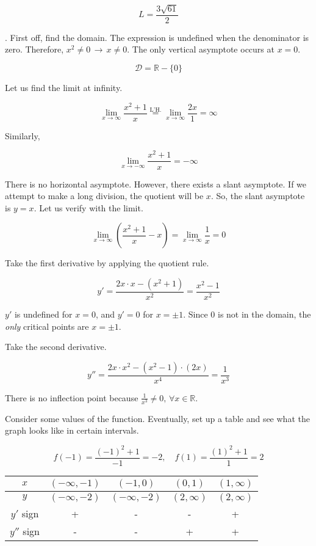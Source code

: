 \documentclass{article}
\begin{document}
\[\boxed{L=\frac{3\sqrt{61}}{2}}\]

\hfill

. First off, find the domain. The expression is undefined when the denominator is zero. Therefore, $x^2 \neq 0 \,\rightarrow\, x\neq0$. The only vertical asymptote occurs at $x = 0$.

\[\mathcal{D} = \mathbb{R} - \{0\} \]

\noindent Let us find the limit at infinity.

\[\lim_{x\to \infty} \frac{x^2+1}{x} \overset{\text{L'H.}}{=} \lim_{x\to \infty} \frac{2x}{1} = \infty\]

\noindent Similarly,

\[\lim_{x\to -\infty} \frac{x^2+ 1}{x} = -\infty\]

\hfill

\noindent There is no horizontal asymptote. However, there exists a slant asymptote. If we attempt to make a long division, the quotient will be $x$. So, the slant asymptote is $y=x$. Let us verify with the limit.

\[\lim_{x\to\infty} \left(\frac{x^2+1}{x} - x\right) = \lim_{x\to\infty} \frac{1}{x} = 0\]

\hfill

\noindent Take the first derivative by applying the quotient rule.

\[y' = \frac{2x\cdot x - (x^2+1)}{x^2}=\frac{x^2-1}{x^2}\]

\hfill

\noindent $y'$ is undefined for $x=0$, and $y'=0$ for $x=\pm1$. Since 0 is not in the domain, the \textit{only} critical points are $x=\pm 1$.

\hfill

\noindent Take the second derivative.

\[y'' = \frac{2x\cdot x^2 - (x^2-1)\cdot(2x)}{x^4}=\frac{1}{x^3}\]

\hfill

\noindent There is no inflection point because $\displaystyle \frac{1}{x^3} \neq 0, \, \forall x \in \mathbb{R}$.

\hfill

\noindent Consider some values of the function. Eventually, set up a table and see what the graph looks like in certain intervals.

\[f(-1) = \frac{(-1)^2 + 1}{-1} = -2,\quad f(1) = \frac{(1)^2 + 1}{1} = 2\]

\begin{center}
    \large
    \begin{tabular}{ |c| c c c c| } 
    \hline
        $x$ & $(-\infty, -1)$ & $(-1, 0)$ & $(0, 1)$ &  $(1, \infty)$ \\
        \hline
        $y$ & $(-\infty, -2)$ & $(-\infty, -2)$ & $(2, \infty)$ & $(2, \infty)$\\
        \hline
        $y'$ sign & + & - & - & + \\
        \hline
        $y''$ sign & - & - & + & + \\
        \hline
    \end{tabular}
\end{center}
\end{document}
